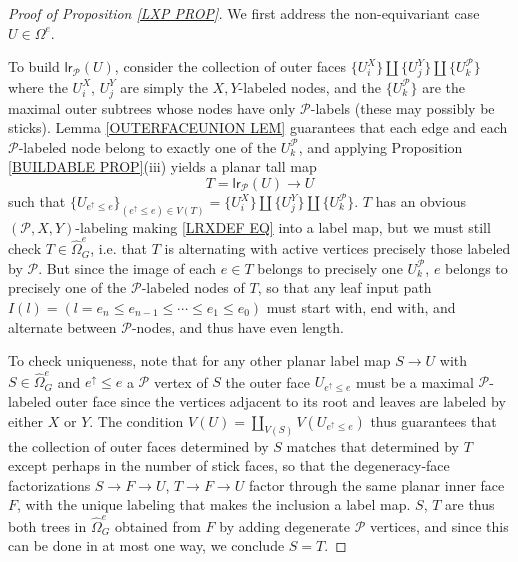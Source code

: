\documentclass[a4paper,10pt
,draft
]{article}%
\numberwithin{equation}{section}
\numberwithin{figure}{section}
\theoremstyle{definition} %
\newcommand{\1}{\ensuremath{\mathbbm 1}}%
\begin{document}
\begin{proof}[Proof of Proposition \ref{LXP PROP}]
	We first address the non-equivariant case $U \in \Omega^e$.

	To build $\mathsf{lr}_{\mathcal{P}}(U)$, consider the collection of outer faces
	$\{U_i^X\} \amalg \{U_j^Y\} \amalg \{U_k^{\mathcal{P}}\}$
where the $U_i^X$, $U_j^Y$ are simply the $X,Y$-labeled nodes,
and the $\{U_k^{\mathcal{P}}\}$ are the maximal outer subtrees whose nodes have only $\mathcal{P}$-labels (these may possibly be sticks). 
Lemma \ref{OUTERFACEUNION LEM} guarantees that 
each edge and each $\mathcal{P}$-labeled node belong to exactly
one of the $U_k^{\mathcal{P}}$, and applying 
Proposition \ref{BUILDABLE PROP}(iii)
yields a planar tall map
\begin{equation}\label{LRXDEF EQ}
T = \mathsf{lr}_{\mathcal{P}}(U) \to U
\end{equation}
such that $\{U_{e^{\uparrow} \leq e}\}_{(e^{\uparrow} \leq e) \in V(T)}
 = \{U_i^X\} \amalg \{U_j^Y\} \amalg 
 \{U_k^{\mathcal{P}}\}$. 
 $T$ has an obvious $(\mathcal{P},X,Y)$-labeling making 
\eqref{LRXDEF EQ} into a label map, but we must still check $T \in \widehat{\Omega}^{e}_G$, i.e. that 
$T$ is alternating with active vertices precisely those labeled by $\mathcal{P}$.
But since the image of each $e \in T$
belongs to precisely one $U_k^{\mathcal{P}}$,
$e$ belongs to precisely one of the $\mathcal{P}$-labeled nodes of $T$, so that any leaf input path
$I(l) = (l = e_n \leq e_{n-1} \leq \cdots \leq e_1 \leq e_0)$
must start with, end with, and alternate between 
$\mathcal{P}$-nodes, and thus have even length.

To check uniqueness, note that for any other planar label map $S \to U$ with $S \in \widehat{\Omega}_G^e$
and $e^{\uparrow} \leq e$ a $\mathcal{P}$ vertex of $S$
the outer face 
$U_{e^{\uparrow} \leq e}$
must be a maximal 
$\mathcal{P}$-labeled outer face since the vertices adjacent to its root and leaves are labeled by either $X$ or $Y$.
The condition 
$V(U) = \coprod_{V(S)} V(U_{e^{\uparrow} \leq e})$
thus guarantees that the collection of outer faces determined by $S$ matches that determined by $T$
except perhaps in the number of stick faces, so that 
the degeneracy-face factorizations
$S \to F \to U$, $T \to F \to U$
factor through the same planar inner face $F$, with the  unique labeling that makes the inclusion a label map.
$S$, $T$ are thus both trees in $\widehat{\Omega}_G^e$ obtained from $F$ by adding degenerate $\mathcal{P}$ vertices, 
and since this can be done in at most one way, we conclude 
$S=T$. 


\end{proof}
\end{document}
